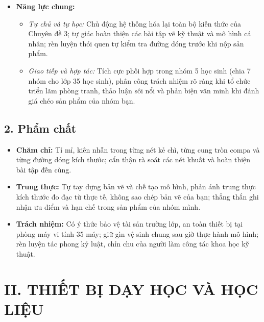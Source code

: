 \documentclass[12pt, a4paper]{article}
\begin{document}
\begin{itemize}[leftmargin=1.2cm]
    \item \textbf{Năng lực chung:}
    \begin{itemize}[leftmargin=0.6cm]
        \item \textit{Tự chủ và tự học:} Chủ động hệ thống hóa lại toàn bộ kiến thức của Chuyên đề 3; tự giác hoàn thiện các bài tập vẽ kỹ thuật và mô hình cá nhân; rèn luyện thói quen tự kiểm tra đường dóng trước khi nộp sản phẩm.
        \item \textit{Giao tiếp và hợp tác:} Tích cực phối hợp trong nhóm 5 học sinh (chia 7 nhóm cho lớp 35 học sinh), phân công trách nhiệm rõ ràng khi tổ chức triển lãm phòng tranh, thảo luận sôi nổi và phản biện văn minh khi đánh giá chéo sản phẩm của nhóm bạn.
    \end{itemize}
\end{itemize}

\subsection*{2. Phẩm chất}

\begin{itemize}[leftmargin=1.2cm]
    \item \textbf{Chăm chỉ:} Tỉ mỉ, kiên nhẫn trong từng nét kẻ chì, từng cung tròn compa và từng đường dóng kích thước; cẩn thận rà soát các nét khuất và hoàn thiện bài tập đến cùng.
    \item \textbf{Trung thực:} Tự tay dựng bản vẽ và chế tạo mô hình, phản ánh trung thực kích thước đo đạc từ thực tế, không sao chép bản vẽ của bạn; thẳng thắn ghi nhận ưu điểm và hạn chế trong sản phẩm của nhóm mình.
    \item \textbf{Trách nhiệm:} Có ý thức bảo vệ tài sản trường lớp, an toàn thiết bị tại phòng máy vi tính 35 máy; giữ gìn vệ sinh chung sau giờ thực hành mô hình; rèn luyện tác phong kỷ luật, chỉn chu của người làm công tác khoa học kỹ thuật.
\end{itemize}

\section*{II. THIẾT BỊ DẠY HỌC VÀ HỌC LIỆU}
\end{document}
